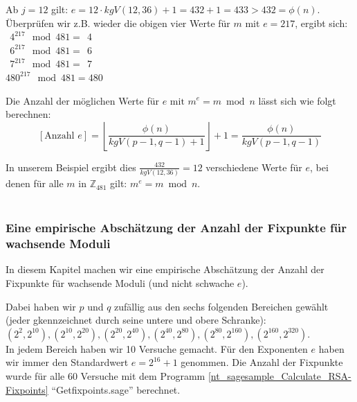 \begin{refsegment}
\noindent Ab $j=12$ gilt: $ e=12\cdot kgV(12,36)+1=432+1=433 > 432=\phi(n)$.\\

\noindent Überprüfen wir z.B. wieder die obigen vier Werte für $m$ mit $e=217$, ergibt sich:\\
$~~4^{217} \mod 481=~~4 $\\
$~~6^{217} \mod 481=~~6 $\\
$~~7^{217} \mod 481=~~7 $\\
$480^{217} \mod 481=480 $\\

\begin{satz}\label{nt-thm-complete-fixed-point-property-number-of-e}
Die Anzahl der möglichen Werte für $e\text{ mit } m^e = m \bmod n$ lässt sich wie folgt berechnen:
\[\left[ \text{Anzahl }e \right]=\left\lfloor \frac{\phi(n)}{kgV(p-1,q-1)+1}\right\rfloor +1=\frac{\phi(n)}{kgV(p-1,q-1)}
\]
\end{satz}

\noindent In unserem Beispiel ergibt dies $\frac{432}{kgV(12,36)}=12 $ verschiedene Werte
für $e$, bei denen für alle $m$ in $\mathbb{Z}_{481}$ gilt: $m^e = m \bmod n$.\\
~\\ %



\newpage
\subsubsection[Empirische Abschätzung der Anzahl der Fixpunkte für wachsende Moduli]
              {Eine empirische Abschätzung der Anzahl der Fixpunkte für wachsende Moduli}
In diesem Kapitel machen wir eine empirische Abschätzung der Anzahl der Fixpunkte
für wachsende Moduli (und nicht schwache $e$).

\noindent Dabei haben wir $p $ und $ q$ zufällig aus den sechs folgenden Bereichen
gewählt (jeder gkennzeichnet durch seine untere und obere Schranke):\\
$(2^2, 2^{10}), (2^{10}, 2^{20}), (2^{20}, 2^{40}), (2^{40}, 2^{80}),
 (2^{80}, 2^{160}), (2^{160}, 2^{320})$.\\
In jedem Bereich haben wir 10 Versuche gemacht. Für den Exponenten $e$ haben wir
immer den Standardwert $e=2^{16}+1$ genommen. Die Anzahl der Fixpunkte wurde für
alle 60 Versuche mit dem Programm
\ref{nt_sagesample_Calculate_RSA-Fixpoints} "`Getfixpoints.sage"' berechnet.


\end{refsegment}
